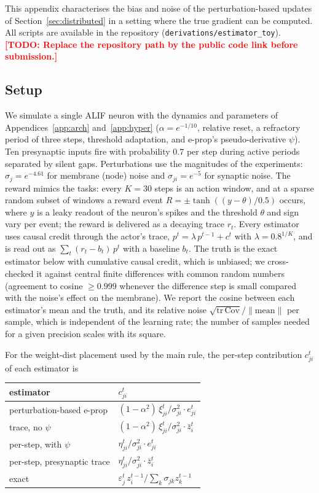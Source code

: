 \documentclass[10pt,twocolumn]{article}
\newcommand{\todo}[1]{\textcolor{red}{\bfseries[TODO: #1]}}
\newcommand{\method}{perturbation-based e-prop}   %
\begin{document}
This appendix characterises the bias and noise of the perturbation-based
updates of Section~\ref{sec:distributed} in a setting where the true gradient
can be computed. All scripts are available in the repository
(\texttt{derivations/estimator\_toy}).\todo{Replace the repository path by the
public code link before submission.}

\subsection{Setup}
\label{app:trace-setup}

We simulate a single ALIF neuron with the dynamics and parameters of
Appendices~\ref{app:arch} and~\ref{app:hyper} ($\alpha=e^{-1/10}$, relative
reset, a refractory period of three steps, threshold adaptation, and e-prop's
pseudo-derivative $\psi$). Ten presynaptic inputs fire with probability $0.7$
per step during active periods separated by silent gaps. Perturbations use the
magnitudes of the experiments: $\sigma_j=e^{-4.61}$ for membrane (node) noise
and $\sigma_{ji}=e^{-5}$ for synaptic noise. The reward mimics the tasks: every
$K=30$ steps is an action window, and at a sparse random subset of windows a
reward event $R=\pm\tanh((y-\theta)/0.5)$ occurs, where $y$ is a leaky readout of
the neuron's spikes and the threshold $\theta$ and sign vary per event; the
reward is delivered as a decaying trace $r_t$. Every estimator uses causal
credit through the actor's trace, $p^t=\lambda\,p^{t-1}+c^t$ with
$\lambda=0.8^{1/K}$, and is read out as $\sum_t (r_t-b_t)\,p^t$ with a baseline
$b_t$. The truth is the exact estimator below with cumulative causal credit,
which is unbiased; we cross-checked it against central finite differences with
common random numbers (agreement to cosine $\ge 0.999$ whenever the difference
step is small compared with the noise's effect on the membrane). We report the
cosine between each estimator's mean and the truth, and its relative noise
$\sqrt{\mathrm{tr}\,\mathrm{Cov}}/\lVert\text{mean}\rVert$ per sample, which is
independent of the learning rate; the number of samples needed for a given
precision scales with its square.

For the weight-dist placement used by the main rule, the per-step contribution
$c^t_{ji}$ of each estimator is

\begin{center}
\footnotesize
\begin{tabular}{@{}ll@{}}
\toprule
estimator & $c^t_{ji}$ \\
\midrule
\method{} & $(1-\alpha^2)\,\xi^t_{ji}/\sigma_{ji}^2\cdot e^t_{ji}$ \\
trace, no $\psi$ & $(1-\alpha^2)\,\xi^t_{ji}/\sigma_{ji}^2\cdot \bar z^t_i$ \\
per-step, with $\psi$ & $\eta^t_{ji}/\sigma_{ji}^2\cdot e^t_{ji}$ \\
per-step, presynaptic trace & $\eta^t_{ji}/\sigma_{ji}^2\cdot \bar z^t_i$ \\
exact & $\varepsilon^t_j\, z^{t-1}_i \big/ \textstyle\sum_k \sigma_{jk} z^{t-1}_k$ \\
\bottomrule
\end{tabular}
\end{center}
\end{document}
